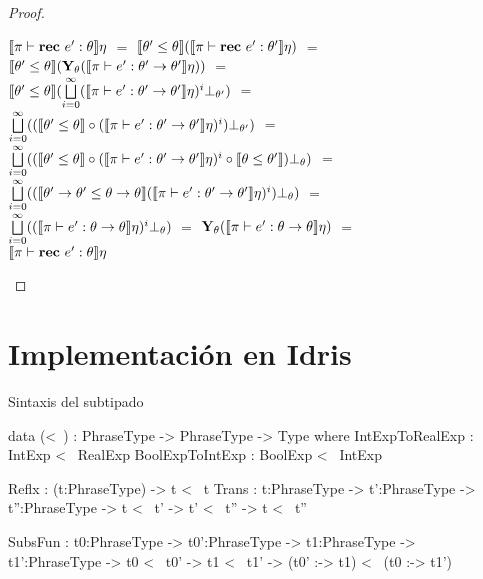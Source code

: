 \begin{proof}
\begin{itemize}
\begin{itemize}
$\llbracket \pi \vdash \textbf{rec} \ e' : \theta \rrbracket \eta$ $=$ 
$\llbracket \theta' \leq \theta \rrbracket (\llbracket \pi \vdash \textbf{rec} \ e' : \theta' \rrbracket \eta)$ $=$\\
$\llbracket \theta' \leq \theta \rrbracket 
	(\textbf{Y}_{\theta} (\llbracket \pi \vdash e' : \theta' \rightarrow \theta' \rrbracket\eta))$ $=$\\
$\llbracket \theta' \leq \theta \rrbracket 
	(\bigsqcup\limits^{\infty}_{i=0} 
	(\llbracket \pi \vdash e' : \theta' \rightarrow \theta' \rrbracket\eta)^{i} \bot_{\theta'})$ $=$\\
$\bigsqcup\limits^{\infty}_{i=0} 
	((\llbracket \theta' \leq \theta \rrbracket \circ
	(\llbracket \pi \vdash e' : \theta' \rightarrow \theta' \rrbracket\eta)^{i}) \bot_{\theta'})$ $=$\\
$\bigsqcup\limits^{\infty}_{i=0} 
	((\llbracket \theta' \leq \theta \rrbracket 
	\circ
	(\llbracket \pi \vdash e' : \theta' \rightarrow \theta' \rrbracket\eta)^{i}
	\circ
	\llbracket \theta \leq \theta' \rrbracket 
	) \bot_{\theta})$ $=$\\
$\bigsqcup\limits^{\infty}_{i=0} 
	((\llbracket \theta' \rightarrow \theta' \leq \theta \rightarrow \theta \rrbracket 
	 (\llbracket \pi \vdash e' : \theta' \rightarrow \theta' \rrbracket\eta)^{i}
	) \bot_{\theta})$ $=$\\
$\bigsqcup\limits^{\infty}_{i=0} (
	(\llbracket \pi \vdash e' : \theta \rightarrow \theta \rrbracket\eta)^{i}
	\bot_{\theta})$ $=$ 
$\textbf{Y}_{\theta} (\llbracket \pi \vdash e' : \theta \rightarrow \theta \rrbracket\eta)$ $=$\\
$\llbracket \pi \vdash \textbf{rec} \ e' : \theta \rrbracket\eta$

\end{itemize}

\end{itemize}

\end{proof}

\section{Implementaci\'on en Idris}

Sintaxis del subtipado
\begin{code}
data (<~) : PhraseType -> PhraseType -> Type where
    IntExpToRealExp : IntExp  <~ RealExp
    BoolExpToIntExp : BoolExp <~ IntExp
    
    Reflx : (t:PhraseType) -> t <~ t
    Trans : {t:PhraseType} -> {t':PhraseType} -> {t'':PhraseType} -> 
            t <~ t' -> t' <~ t'' -> t <~ t''
            
    SubsFun : {t0:PhraseType} -> {t0':PhraseType} -> 
              {t1:PhraseType} -> {t1':PhraseType} -> 
              t0 <~ t0' -> t1 <~ t1' -> (t0' :-> t1) <~ (t0 :-> t1')
\end{code}


